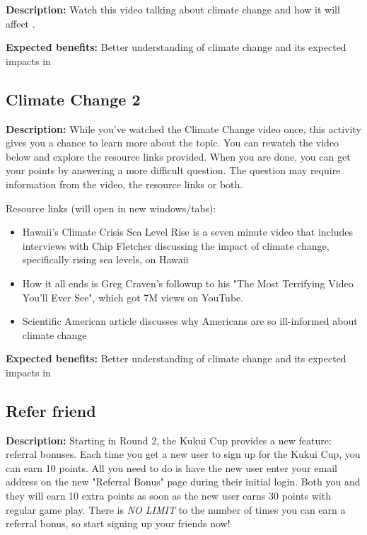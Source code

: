 \textbf{Description:} Watch this video talking about climate change and how it will affect \Hawaii.

\vspace{2ex}
\textbf{Expected benefits:} Better understanding of climate change and its expected impacts in \Hawaii


\subsection{Climate Change 2}

\textbf{Description:} While you've watched the Climate Change video once, this activity gives you a chance to learn more about the topic. You can rewatch the video below and explore the resource links provided. When you are done, you can get your points by answering a more difficult question. The question may require information from the video, the resource links or both.

Resource links (will open in new windows/tabs):

\begin{itemize}
	\item Hawaii's Climate Crisis Sea Level Rise is a seven minute video that includes interviews with Chip Fletcher discussing the impact of climate change, specifically rising sea levels, on Hawaii
	\item How it all ends is Greg Craven's followup to his "The Most Terrifying Video You'll Ever See", which got 7M views on YouTube.
	\item Scientific American article discusses why Americans are so ill-informed about climate change
\end{itemize}

\vspace{2ex}
\textbf{Expected benefits:} Better understanding of climate change and its expected impacts in \Hawaii


\subsection{Refer friend}

\textbf{Description:} Starting in Round 2, the Kukui Cup provides a new feature: referral bonuses. Each time you get a new user to sign up for the Kukui Cup, you can earn 10 points. All you need to do is have the new user enter your email address on the new "Referral Bonus" page during their initial login.   Both you and they will earn 10 extra points as soon as the new user earns 30 points with regular game play. There is \emph{NO LIMIT} to the number of times you can earn a referral bonus, so start signing up your friends now!


